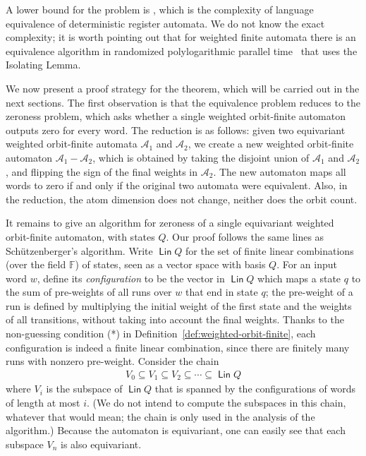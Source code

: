 \documentclass{theoretics}
\newcommand{\Aa}{{\mathcal A}}
\DeclareMathOperator{\lin}{\mathsf{Lin}}
\newcommand{\field}{\mathbb F}
\newcommand{\schutz}{Sch\"utzenberger\xspace}
\newcommand{\pspace}{{\sc{PSpace}}\xspace }
\begin{document}
A lower bound for the problem is \pspace, which is the complexity of language equivalence of deterministic register automata. We do not know the exact complexity; it is worth pointing out that for weighted finite automata there is an equivalence algorithm in randomized polylogarithmic parallel time~\cite[Sec.~3.2]{kiefer2013} that uses the Isolating Lemma.

We now present a proof strategy for the theorem, which will be carried out in the next sections.  The first observation is that the equivalence problem reduces to the zeroness problem, which asks whether a single weighted orbit-finite automaton outputs zero for every  word. The reduction is as follows: given two equivariant weighted orbit-finite automata $\Aa_1$ and $\Aa_2$, we create a new weighted orbit-finite automaton $\Aa_1 - \Aa_2$, which is obtained by taking the disjoint union of $\Aa_1$ and $\Aa_2$, and flipping the  sign of the final weights in $\Aa_2$. The new automaton maps all  words to zero if and only if the original two automata were equivalent. Also, in the reduction, the atom dimension does not change, neither does the orbit count.


It remains to give an algorithm for zeroness of a single equivariant  weighted orbit-finite automaton, with states $Q$. Our proof follows the same lines as \schutz's algorithm. Write $\lin Q$ for the set of  finite linear combinations (over the field $\field$) of states, seen as a vector space with basis $Q$.  For an input   word $w$, define its \emph{configuration} to be the vector in $\lin Q$
which maps a state $q$ to the sum of pre-weights of all runs over $w$ that end in state $q$; the pre-weight of a run is defined by multiplying the initial weight of the first state and the weights of all transitions, without taking into account the final weights. Thanks to the non-guessing condition (*) in Definition~\ref{def:weighted-orbit-finite}, each configuration is indeed a finite linear combination, since there are finitely many runs with nonzero pre-weight.  Consider  the  chain
\begin{align*}
V_0 \subseteq V_1 \subseteq V_2 \subseteq \cdots \subseteq \lin Q
\end{align*}
where $V_i$ is the  subspace of $\lin Q$ that is spanned by the configurations of   words of length at most  $i$. (We do not intend to compute the subspaces in this chain, whatever that would mean;  the chain is only used in the analysis of the algorithm.) Because the automaton is equivariant, one can easily see that each subspace $V_n$ is also equivariant. 
\end{document}
